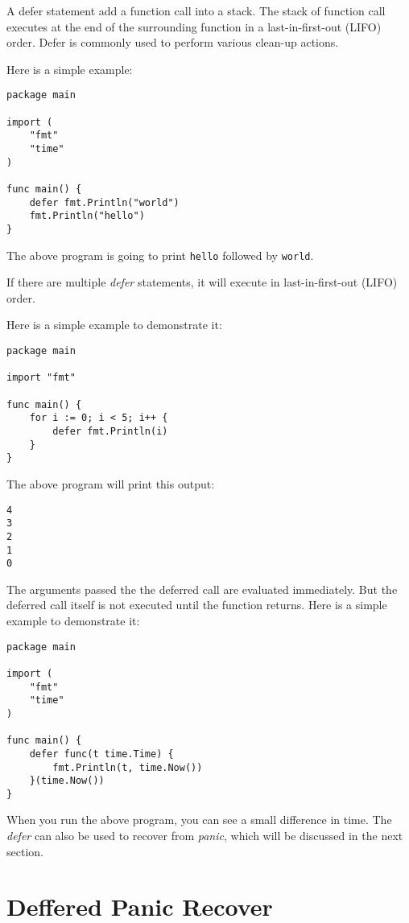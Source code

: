 A defer statement add a function call into a stack. The stack of
function call executes at the end of the surrounding function in a
last-in-first-out (LIFO) order. Defer is commonly used to perform
various clean-up actions.

Here is a simple example:

\begin{lstlisting}[caption=Defer usage]
package main

import (
    "fmt"
    "time"
)

func main() {
    defer fmt.Println("world")
    fmt.Println("hello")
}
\end{lstlisting}

The above program is going to print \texttt{hello} followed
by \texttt{world}.

If there are multiple \textit{defer} statements, it will execute in
last-in-first-out (LIFO) order.

Here is a simple example to demonstrate it:

\begin{lstlisting}[caption=Defer usage]
package main

import "fmt"

func main() {
    for i := 0; i < 5; i++ {
        defer fmt.Println(i)
    }
}
\end{lstlisting}

The above program will print this output:

\begin{lstlisting}[numbers=none]
4
3
2
1
0
\end{lstlisting}

The arguments passed the the deferred call are evaluated immediately.
But the deferred call itself is not executed until the function
returns.  Here is a simple example to demonstrate it:

\begin{lstlisting}[caption=Defer argument evaluation]
package main

import (
    "fmt"
    "time"
)

func main() {
    defer func(t time.Time) {
        fmt.Println(t, time.Now())
    }(time.Now())
}
\end{lstlisting}

When you run the above program, you can see a small difference in
time.  The \textit{defer} can also be used to recover
from \textit{panic}, which will be discussed in the next section.

\section{Deffered Panic Recover}

